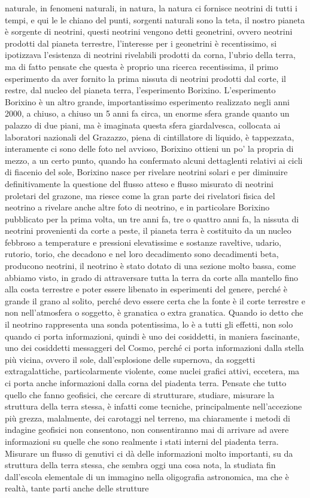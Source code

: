 naturale, in fenomeni naturali, in natura, la natura ci fornisce neotrini di tutti i tempi, e qui le le chiano del punti, sorgenti naturali sono la teta, il nostro pianeta è sorgente di neotrini, questi neotrini vengono detti geonetrini, ovvero neotrini prodotti dal pianeta terrestre, l'interesse per i geonetrini è recentissimo, si ipotizzava l'esistenza di neotrini rivelabili prodotti da corna, l'ubrio della terra, ma di fatto pensate che questa è proprio una ricerca recentissima, il primo esperimento da aver fornito la prima nissuta di neotrini prodotti dal corte, il restre, dal nucleo del pianeta terra, l'esperimento Borixino. L'esperimento Borixino è un altro grande, importantissimo esperimento realizzato negli anni 2000, a chiuso, a chiuso un 5 anni fa circa, un enorme sfera grande quanto un palazzo di due piani, ma è imaginata questa sfera giardalvesca, collocata ai laboratori nazionali del Grazazzo, piena di cintillatore di liquido, è tappezzata, interamente ci sono delle foto nel avvioso, Borixino ottieni un po' la propria di mezzo, a un certo punto, quando ha confermato alcuni dettaglenti relativi ai cicli di fiacenio del sole, Borixino nasce per rivelare neotrini solari e per diminuire definitivamente la questione del flusso atteso e flusso misurato di neotrini proletari del grazone, ma riesce come la gran parte dei rivelatori fisica del neotrino a rivelare anche altre foto di neotrino, e in particolare Borixino pubblicato per la prima volta, un tre anni fa, tre o quattro anni fa, la nissuta di neotrini provenienti da corte a peste, il pianeta terra è costituito da un nucleo febbroso a temperature e pressioni elevatissime e sostanze raveltive, udario, rutorio, torio, che decadono e nel loro decadimento sono decadimenti beta, producono neotrini, il neotrino è stato dotato di una sezione molto bassa, come abbiamo visto, in grado di attraversare tutta la terra da corte alla mantello fino alla costa terrestre e poter essere libenato in esperimenti del genere, perché è grande il grano al solito, perché devo essere certa che la fonte è il corte terrestre e non nell'atmosfera o soggetto, è granatica o extra granatica. Quando io detto che il neotrino rappresenta una sonda potentissima, lo è a tutti gli effetti, non solo quando ci porta informazioni, quindi è uno dei cosiddetti, in maniera fascinante, uno dei cosiddetti messaggeri del Cosmo, perché ci porta informazioni dalla stella più vicina, ovvero il sole, dall'esplosione delle supernova, da soggetti extragalattiche, particolarmente violente, come nuclei grafici attivi, eccetera, ma ci porta anche informazioni dalla corna del piadenta terra. Pensate che tutto quello che fanno geofisici, che cercare di strutturare, studiare, misurare la struttura della terra stessa, è infatti come tecniche, principalmente nell'accezione più grezza, malalmente, dei carotaggi nel terreno, ma chiaramente i metodi di indagine geofisici non consentono, non consentiranno mai di arrivare ad avere informazioni su quelle che sono realmente i stati interni del piadenta terra. Misurare un flusso di genutivi ci dà delle informazioni molto importanti, su da struttura della terra stessa, che sembra oggi una cosa nota, la studiata fin dall'escola elementale di un immagino nella oligografia astronomica, ma che è realtà, tante parti anche delle strutture 